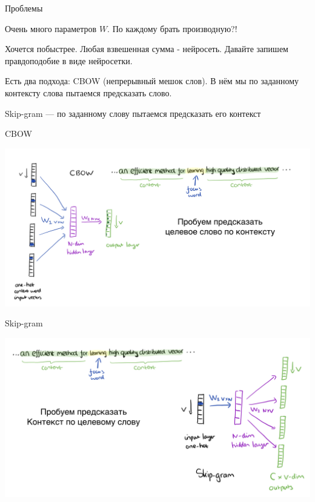\documentclass[notes,12pt, aspectratio=169]{beamer}
\newenvironment{wideitemize}{\itemize\addtolength{\itemsep}{10pt}}{\enditemize}
\begin{document}
\begin{frame}{Проблемы}
\begin{wideitemize} 
\item Очень много параметров $W$. По каждому брать производную?! 

\item Хочется побыстрее. Любая взвешенная сумма - нейросеть. Давайте запишем правдоподобие в виде нейросетки.

\item Есть два подхода: CBOW (непрерывный мешок слов). В нём мы по заданному контексту слова пытаемся предсказать слово.

\item Skip-gram — по заданному слову пытаемся предсказать его контекст 
\end{wideitemize} 
\end{frame} 


\begin{frame}{CBOW}
\begin{center}
\includegraphics[width=.95\linewidth]{CBOW.png}
\end{center}
\end{frame} 


\begin{frame}{Skip-gram}
\begin{center}
\includegraphics[width=.95\linewidth]{skipgram.png}
\end{center}
\end{frame} 
\end{document}
